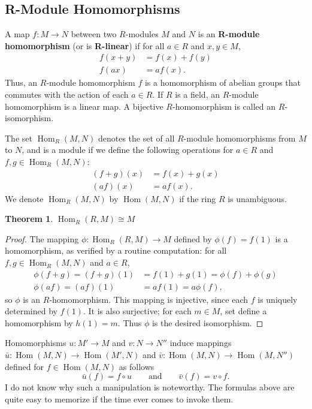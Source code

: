 \documentclass[11pt]{article}
\newtheorem{theorem}{Theorem}
\newcommand{\Hom}{\operatorname{Hom}}
\begin{document}

\subsection{R-Module Homomorphisms}

A map $f: M \to N$ between two $R$-modules $M$ and $N$ is an \textbf{R-module homomorphism} (or is \textbf{R-linear}) if for all $a \in R$ and $x, y \in M$,
\begin{align*}
	f(x + y) & = f(x) + f(y) \\
	f(ax)    & = a f(x).
\end{align*}
Thus, an $R$-module homomorphism $f$ is a homomorphism of abelian groups that commutes with the action of each $a \in R$. If $R$ is a field, an $R$-module homomorphism is a linear map. A bijective $R$-homomorphism is called an $R$-isomorphism.

The set $\Hom_{R}(M, N)$ denotes the set of all $R$-module homomorphisms from $M$ to $N$, and is a module if we define the following operations for $a \in R$ and $f, g \in \Hom_{R}(M, N)$:
  \begin{align*}
	(f + g)(x) & = f(x) + g(x) \\
	(af)(x)    & = a f(x).
\end{align*}
We denote $\Hom_{R}(M, N)$ by $\Hom(M, N)$ if the ring $R$ is unambiguous.

\begin{adjustwidth}{0.5cm}{}
	\begin{theorem}
		$\Hom_{R}(R, M) \cong M$
	\end{theorem}
	\begin{proof}
		The mapping $\phi : \Hom_{R}(R, M) \to M$ defined by $\phi(f) = f(1)$ is a homomorphism, as verified by a routine computation: for all $f, g \in \Hom_{R}(M, N)$ and $a \in R$,
		\begin{align*}
      \phi(f + g) = (f + g)(1) &= f(1) + g(1) = \phi(f) + \phi(g) \\
            \phi(af) = (af)(1) &= a f(1) = a \phi(f),
		\end{align*}
		so $\phi$ is an $R$-homomorphism. This mapping is injective, since each $f$ is uniquely determined by $f(1)$. It is also surjective; for each $m \in M$, set define a homomorphism by $h(1) = m$. Thus $\phi$ is the desired isomorphism.
	\end{proof}
\end{adjustwidth}

Homomorphisms $u : M' \to M$ and $v : N \to N''$ induce mappings $\bar{u} : \Hom(M, N) \to \Hom(M', N)$ and $\bar{v} : \Hom(M, N) \to \Hom(M, N'')$ defined for $f \in \Hom(M, N)$ as follows
\[
	\bar{u}(f) = f \circ u \qquad \text{and} \qquad \bar{v}(f) = v \circ f.
\]
I do not know why such a manipulation is noteworthy. The formulas above are quite easy to memorize if the time ever comes to invoke them.
\end{document}
